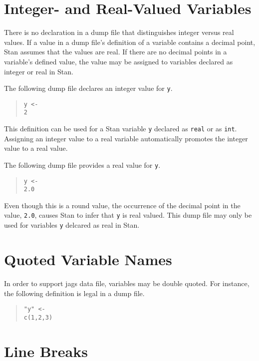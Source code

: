 \documentclass[10pt]{report}
\newcommand{\Stan}{Stan\xspace}
\newcommand{\acronym}[1]{{\sc #1}\xspace}
\newcommand{\JAGS}{\acronym{jags}}
\newcommand{\code}[1]{{\tt #1}}
\begin{document}
\section{Integer- and Real-Valued Variables}

There is no declaration in a dump file that distinguishes integer
versus real values.  If a value in a dump file's definition of a
variable contains a decimal point, \Stan assumes that the values are
real.  If there are no decimal points in a variable's defined value, 
the value may be assigned to variables declared as integer or real
in \Stan.

The following dump file declares an integer value for \code{y}.
%
\begin{quote}
\begin{Verbatim} 
y <- 
2
\end{Verbatim}
\end{quote}
% 
This definition can be used for a \Stan variable \code{y} declared as
\code{real} or as \code{int}.  Assigning an integer value to a real
variable automatically promotes the integer value to a real value.

The following dump file provides a real value for \code{y}.
%
\begin{quote}
\begin{Verbatim}
y <-
2.0
\end{Verbatim}
\end{quote}
%
Even though this is a round value, the occurrence of the decimal
point in the value, \code{2.0}, causes \Stan to infer that \code{y} is
real valued.  This dump file may only be used for variables \code{y}
delcared as real in \Stan.


\section{Quoted Variable Names}

In order to support \JAGS data file, variables may be double quoted.
For instance, the following definition is legal in a dump file.
%
\begin{quote}
\begin{Verbatim}
"y" <-
c(1,2,3)
\end{Verbatim}
\end{quote}

\section{Line Breaks}
\end{document}
